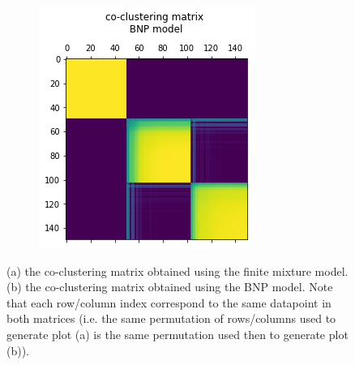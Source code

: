\documentclass[a4paper]{article}
\begin{document}
\begin{figure}[h!]
\begin{subfigure}[t]{0.3\textwidth}
    \includegraphics[width = \textwidth]{./finite_mixture_figures/bnp_coclust.png}
    \subcaption{}
  \end{subfigure}
	\caption{(a) the co-clustering matrix obtained using the finite mixture model. (b) the co-clustering matrix
  obtained using the BNP model. Note that each row/column index correspond to the same datapoint in both matrices (i.e. the
  same permutation of rows/columns used to generate plot (a) is the same permutation used then to generate plot (b)).}
  \label{fig:BNP_vs_FMM_coclustering}
\end{figure}
\end{document}

